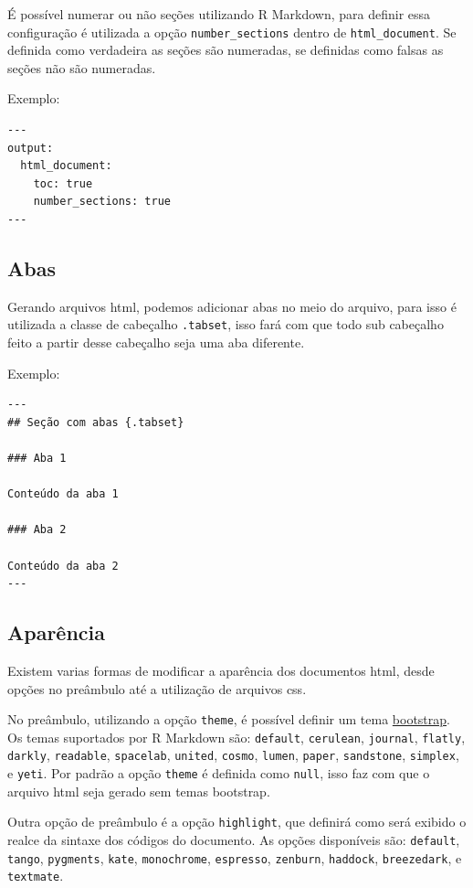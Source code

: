 \documentclass[
]{book}
\begin{document}
É possível numerar ou não seções utilizando R Markdown, para definir essa configuração é utilizada a opção \texttt{number\_sections} dentro de \texttt{html\_document}. Se definida como verdadeira as seções são numeradas, se definidas como falsas as seções não são numeradas.

Exemplo:

\begin{verbatim}
---
output:
  html_document:
    toc: true
    number_sections: true
---
\end{verbatim}

\hypertarget{abas}{%
\subsection{Abas}\label{abas}}

Gerando arquivos html, podemos adicionar abas no meio do arquivo, para isso é utilizada a classe de cabeçalho \texttt{.tabset}, isso fará com que todo sub cabeçalho feito a partir desse cabeçalho seja uma aba diferente.

Exemplo:

\begin{verbatim}
---
## Seção com abas {.tabset}
    
### Aba 1
    
Conteúdo da aba 1
  
### Aba 2
  
Conteúdo da aba 2
---
\end{verbatim}

\hypertarget{aparuxeancia}{%
\subsection{Aparência}\label{aparuxeancia}}

Existem varias formas de modificar a aparência dos documentos html, desde opções no preâmbulo até a utilização de arquivos css.

No preâmbulo, utilizando a opção \texttt{theme}, é possível definir um tema \href{https://bootswatch.com/3/}{bootstrap}. Os temas suportados por R Markdown são: \texttt{default}, \texttt{cerulean}, \texttt{journal}, \texttt{flatly}, \texttt{darkly}, \texttt{readable}, \texttt{spacelab}, \texttt{united}, \texttt{cosmo}, \texttt{lumen}, \texttt{paper}, \texttt{sandstone}, \texttt{simplex}, e \texttt{yeti}. Por padrão a opção \texttt{theme} é definida como \texttt{null}, isso faz com que o arquivo html seja gerado sem temas bootstrap.

Outra opção de preâmbulo é a opção \texttt{highlight}, que definirá como será exibido o realce da sintaxe dos códigos do documento. As opções disponíveis são: \texttt{default}, \texttt{tango}, \texttt{pygments}, \texttt{kate}, \texttt{monochrome}, \texttt{espresso}, \texttt{zenburn}, \texttt{haddock}, \texttt{breezedark}, e \texttt{textmate}.
\end{document}
